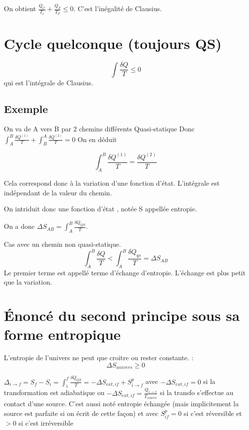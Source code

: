 \documentclass[french]{yLectureNote}
\begin{document}
On obtient $\frac{Q_C}{T_c}+\frac{Q_F}{T_F}\leq 0$. C'est l'inégalité de Clausius.
\section{Cycle quelconque (toujours QS)}
$$\int \frac{\delta Q}{T}\leq 0$$ qui est l'intégrale de Clausius.
\subsection{Exemple}
On va de A vers B par 2 chemins différents Quasi-statique
Donc $\int_A^B \frac{\delta Q^{(1)}}{T}+\int_B^A\frac{\delta Q^{(2)}}{T} = 0$
On en déduit
\begin{theorem}
    $$\int_A^B \frac{\delta Q^{(1)}}{T} = \frac{\delta Q^{(2)}}{T}$$
\end{theorem}
Cela correspond donc à la variation d'une fonction d'état. L'intégrale est indépendant de la valeur du chemin.

On intriduit donc une fonction d'état , notée S appellée entropie.

On a donc $\Delta S_{AB} = \int_A^B \frac{\delta Q_{QS}}{T}$.

Cas avec un chemin non quasi-statique.
$$\int_A^B \frac{\delta Q}{T} < \int_A^B \frac{\delta Q_{qs}}{T} = \Delta S_{AB}$$
Le premier terme est appellé terme d'échange d'entropie. L'échange est plus petit que la variation.

\section{Énoncé du second principe sous sa forme entropique}
\begin{theorem}
    L'entropie de l'univers ne peut que croitre ou rester constante. : $$\Delta S_{univers}\geq 0$$
\end{theorem}
\begin{theorem}
    $\Delta_{i\to f} = S_f-S_i = \int_i^f \frac{\delta Q_{QS}}{T} = -\Delta S_{ext, if}+S^p_{i\to f}$
    avec $-\Delta S_{ext,if} = 0$ si la transformation est adiabatique ou $-\Delta S_{ext,if} = \frac{Q_{i\to f}}{T_{source}}$ si la transfo s'effectue au contact d'une source.
    C'est aussi noté entropie échangée (mais implicitement la source est parfaite si on écrit de cette façon)
    et avec $S^p_{if}=0$ si c'est réversible et $>0$ si c'est irréversible
\end{theorem}
\end{document}
